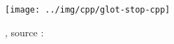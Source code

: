 \begin{center}
  \begin{figure}[h]
    \centering
    \texttt{[image: ../img/cpp/glot-stop-cpp]}
    \caption{, source :~\cite{collins}}
    \label{fig:f-v}
  \end{figure}
\end{center}


\newpage
\minitoc
\newpage

